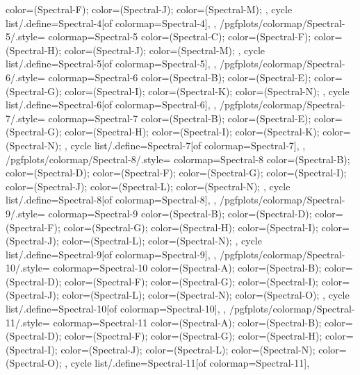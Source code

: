 {{{      color=(Spectral-F);
      color=(Spectral-J);
      color=(Spectral-M);
    },
    cycle list/.define={Spectral-4}{[of colormap=Spectral-4]},
  },
  /pgfplots/colormap/Spectral-5/.style={
    colormap={Spectral-5}{
      color=(Spectral-C);
      color=(Spectral-F);
      color=(Spectral-H);
      color=(Spectral-J);
      color=(Spectral-M);
    },
    cycle list/.define={Spectral-5}{[of colormap=Spectral-5]},
  },
  /pgfplots/colormap/Spectral-6/.style={
    colormap={Spectral-6}{
      color=(Spectral-B);
      color=(Spectral-E);
      color=(Spectral-G);
      color=(Spectral-I);
      color=(Spectral-K);
      color=(Spectral-N);
    },
    cycle list/.define={Spectral-6}{[of colormap=Spectral-6]},
  },
  /pgfplots/colormap/Spectral-7/.style={
    colormap={Spectral-7}{
      color=(Spectral-B);
      color=(Spectral-E);
      color=(Spectral-G);
      color=(Spectral-H);
      color=(Spectral-I);
      color=(Spectral-K);
      color=(Spectral-N);
    },
    cycle list/.define={Spectral-7}{[of colormap=Spectral-7]},
  },
  /pgfplots/colormap/Spectral-8/.style={
    colormap={Spectral-8}{
      color=(Spectral-B);
      color=(Spectral-D);
      color=(Spectral-F);
      color=(Spectral-G);
      color=(Spectral-I);
      color=(Spectral-J);
      color=(Spectral-L);
      color=(Spectral-N);
    },
    cycle list/.define={Spectral-8}{[of colormap=Spectral-8]},
  },
  /pgfplots/colormap/Spectral-9/.style={
    colormap={Spectral-9}{
      color=(Spectral-B);
      color=(Spectral-D);
      color=(Spectral-F);
      color=(Spectral-G);
      color=(Spectral-H);
      color=(Spectral-I);
      color=(Spectral-J);
      color=(Spectral-L);
      color=(Spectral-N);
    },
    cycle list/.define={Spectral-9}{[of colormap=Spectral-9]},
  },
  /pgfplots/colormap/Spectral-10/.style={
    colormap={Spectral-10}{
      color=(Spectral-A);
      color=(Spectral-B);
      color=(Spectral-D);
      color=(Spectral-F);
      color=(Spectral-G);
      color=(Spectral-I);
      color=(Spectral-J);
      color=(Spectral-L);
      color=(Spectral-N);
      color=(Spectral-O);
    },
    cycle list/.define={Spectral-10}{[of colormap=Spectral-10]},
  },
  /pgfplots/colormap/Spectral-11/.style={
    colormap={Spectral-11}{
      color=(Spectral-A);
      color=(Spectral-B);
      color=(Spectral-D);
      color=(Spectral-F);
      color=(Spectral-G);
      color=(Spectral-H);
      color=(Spectral-I);
      color=(Spectral-J);
      color=(Spectral-L);
      color=(Spectral-N);
      color=(Spectral-O);
    },
    cycle list/.define={Spectral-11}{[of colormap=Spectral-11]},
}}

